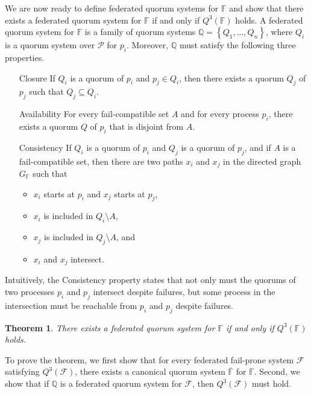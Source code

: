 \documentclass[11pt]{article}
\newtheorem{thm}{Theorem}
\begin{document}
We are now ready to define federated quorum systems for $\mathbb{F}$ and show that there exists a federated quorum system for $\mathbb{F}$ if and only if $Q^3(\mathbb{F})$ holds. A federated quorum system for $\mathbb{F}$ is a family of quorum systems $\mathbb{Q}=\left\{Q_1,...,Q_n\right\}$, where $Q_i$ is a quorum system over $\mathcal{P}$ for $p_i$. Moreover, $\mathbb{Q}$ must satisfy the following three properties.
\begin{itemize}
  \item [Closure] If $Q_i$ is a quorum of $p_i$ and $p_j\in Q_i$, then there exists a quorum $Q_j$ of $p_j$ such that $Q_j\subseteq Q_i$.
  \item [Availability] For every fail-compatible set $A$ and for every process $p_i$, there exists a quorum $Q$ of $p_i$ that is disjoint from $A$.
  \item[Consistency] If $Q_i$ is a quorum of $p_i$ and $Q_j$ is a quorum of $p_j$, and if $A$ is a fail-compatible set, then there are two paths $x_i$ and $x_j$ in the directed graph $G_{\mathbb{F}}$ such that
    \begin{itemize}
      \item $x_i$ starts at $p_i$ and $x_j$ starts at $p_j$,
      \item $x_i$ is included in $Q_i\setminus A$,
      \item $x_j$ is included in $Q_j\setminus A$, and
      \item $x_i$ and $x_j$ intersect.
    \end{itemize}
\end{itemize}

Intuitively, the Consistency property states that not only must the quorums of two processes $p_i$ and $p_j$ intersect despite failures, but some process in the intersection must be reachable from $p_i$ and $p_j$ despite failures.

\begin{thm}
  There exists a federated quorum system for $\mathbb{F}$ if and only if $Q^3(\mathbb{F})$ holds.
\end{thm}

To prove the theorem, we first show that for every federated fail-prone system $\mathcal{F}$ satisfying $Q^3(\mathcal{F})$, there exists a canonical quorum system $\overline{\mathbb{F}}$ for $\mathbb{F}$. Second, we show that if $\mathbb{Q}$ is a federated quorum system for $\mathcal{F}$, then $Q^3(\mathcal{F})$ must hold.
\end{document}
